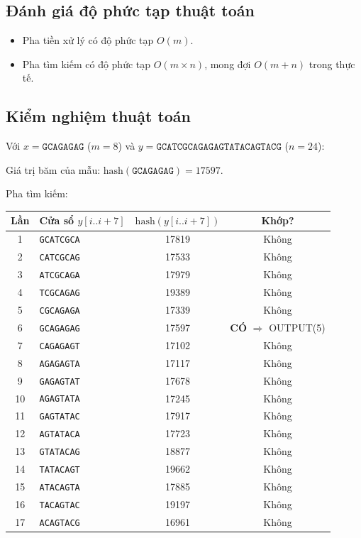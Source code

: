 \documentclass[12pt,twoside,openright]{extreport}
\begin{document}
\subsection{Đánh giá độ phức tạp thuật toán}

\begin{itemize}
	\item Pha tiền xử lý có độ phức tạp $O(m)$.
	\item Pha tìm kiếm có độ phức tạp $O(m \times n)$, mong đợi $O(m + n)$ trong thực tế.
\end{itemize}

\subsection{Kiểm nghiệm thuật toán}

Với $x = \texttt{GCAGAGAG}$ ($m = 8$) và $y = \texttt{GCATCGCAGAGAGTATACAGTACG}$ ($n = 24$):

Giá trị băm của mẫu: $\text{hash}(\texttt{GCAGAGAG}) = 17597$.

Pha tìm kiếm:

\begin{center}
\begin{tabular}{|c|l|c|c|}
\hline
Lần & Cửa sổ $y[i..i+7]$ & $\text{hash}(y[i..i+7])$ & Khớp? \\
\hline
1  & \texttt{GCATCGCA} & 17819 & Không \\
2  & \texttt{CATCGCAG} & 17533 & Không \\
3  & \texttt{ATCGCAGA} & 17979 & Không \\
4  & \texttt{TCGCAGAG} & 19389 & Không \\
5  & \texttt{CGCAGAGA} & 17339 & Không \\
6  & \texttt{GCAGAGAG} & 17597 & \textbf{CÓ} $\Rightarrow$ OUTPUT(5) \\
7  & \texttt{CAGAGAGT} & 17102 & Không \\
8  & \texttt{AGAGAGTA} & 17117 & Không \\
9  & \texttt{GAGAGTAT} & 17678 & Không \\
10 & \texttt{AGAGTATA} & 17245 & Không \\
11 & \texttt{GAGTATAC} & 17917 & Không \\
12 & \texttt{AGTATACA} & 17723 & Không \\
13 & \texttt{GTATACAG} & 18877 & Không \\
14 & \texttt{TATACAGT} & 19662 & Không \\
15 & \texttt{ATACAGTA} & 17885 & Không \\
16 & \texttt{TACAGTAC} & 19197 & Không \\
17 & \texttt{ACAGTACG} & 16961 & Không \\
\hline
\end{tabular}
\end{center}
\end{document}
